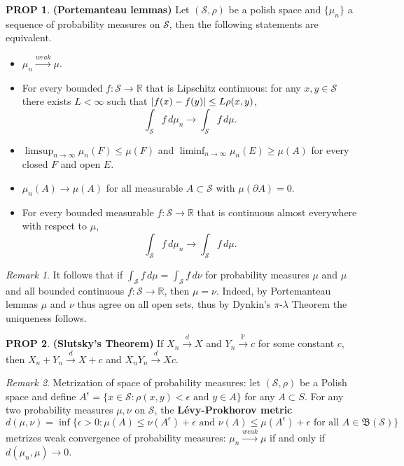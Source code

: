\documentclass[hidelinks,11pt]{article}
\theoremstyle{definition}
\theoremstyle{dotless}
\newtheorem{prop}{PROP}[section]
\theoremstyle{remark}
\newtheorem*{remark}{Remark}
\DeclareMathOperator{\1}{\mathbf{1}}
\begin{document}
\begin{prop}\textup{\textbf{(Portemanteau lemmas)}} Let $(\mathcal{S},\rho)$ be a polish space and $\{\mu_n\}$ a sequence of probability measures on $\mathcal{S}$, then the following statements are equivalent.\begin{itemize}
    \item $\mu_n\xrightarrow{weak}\mu$.
    \item For every bounded $f:\mathcal{S}\to\mathbb{R}$ that is Lipschitz continuous: for any $x,y\in\mathcal{S}$ there exists $L<\infty$ such that $\abs{f(x)-f(y)}\leq L\rho(x,y)$,
    \[\int_\mathcal{S}f\,d\mu_n\to\int_\mathcal{S}f\,d\mu.\]
    \item $\limsup_{n\to\infty}\mu_n(F)\leq\mu(F)$ and $\liminf_{n\to\infty}\mu_n(E)\geq\mu(A)$ for every closed $F$ and open $E$.
    \item $\mu_n(A)\to\mu(A)$ for all measurable $A\subset\mathcal{S}$ with $\mu(\partial A)=0$.
    \item For every bounded measurable $f:\mathcal{S}\to\mathbb{R}$ that is continuous almost everywhere with respect to $\mu$,
    \[\int_\mathcal{S}f\,d\mu_n\to\int_\mathcal{S}f\,d\mu.\]
\end{itemize}
\end{prop}

\begin{remark}
It follows that if $\int_\mathcal{S}f\,d\mu=\int_\mathcal{S}f\,d\nu$ for probability measures $\mu$ and $\mu$  and all bounded continuous $f:\mathcal{S}\to\mathbb{R}$, then $\mu=\nu$. Indeed, by Portemanteau lemmas $\mu$ and $\nu$ thus agree on all open sets, thus by Dynkin's $\pi$-$\lambda$ Theorem the uniqueness follows.
\end{remark}

\begin{prop}\textup{\textbf{(Slutsky's Theorem) }}If $X_n\xrightarrow{d}X$ and $Y_n\xrightarrow{\mathbb{P}}c$ for some constant $c$, then $X_n+Y_n\xrightarrow{d}X+c$ and $X_nY_n\xrightarrow{d}Xc$.
\end{prop}

\begin{remark}
Metrization of space of probability measures: let $(\mathcal{S},\rho)$ be a Polish space and define $A^\epsilon=\{x\in\mathcal{S}:\rho(x,y)<\epsilon\textrm{ and }y\in A\}$ for any $A\subset S$. For any two probability measures $\mu,\nu$ on $\mathcal{S}$, the \textbf{Lévy-Prokhorov metric}
\[d(\mu,\nu)=\inf\{\epsilon>0:\mu(A)\leq\nu(A^\epsilon)+\epsilon\textrm{ and }\nu(A)\leq\mu(A^\epsilon)+\epsilon\textrm{ for all }A\in\mathfrak{B}(\mathcal{S})\}\]
metrizes weak convergence of probability measures: $\mu_n\xrightarrow{weak}\mu$ if and only if $d(\mu_n,\mu)\to0$.
\end{remark}
\end{document}
